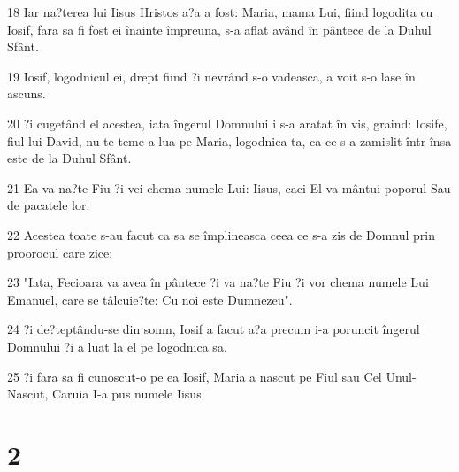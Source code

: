 \par 18 Iar na?terea lui Iisus Hristos a?a a fost: Maria, mama Lui, fiind logodita cu Iosif, fara sa fi fost ei înainte împreuna, s-a aflat având în pântece de la Duhul Sfânt.
\par 19 Iosif, logodnicul ei, drept fiind ?i nevrând s-o vadeasca, a voit s-o lase în ascuns.
\par 20 ?i cugetând el acestea, iata îngerul Domnului i s-a aratat în vis, graind: Iosife, fiul lui David, nu te teme a lua pe Maria, logodnica ta, ca ce s-a zamislit într-însa este de la Duhul Sfânt.
\par 21 Ea va na?te Fiu ?i vei chema numele Lui: Iisus, caci El va mântui poporul Sau de pacatele lor.
\par 22 Acestea toate s-au facut ca sa se împlineasca ceea ce s-a zis de Domnul prin proorocul care zice:
\par 23 "Iata, Fecioara va avea în pântece ?i va na?te Fiu ?i vor chema numele Lui Emanuel, care se tâlcuie?te: Cu noi este Dumnezeu".
\par 24 ?i de?teptându-se din somn, Iosif a facut a?a precum i-a poruncit îngerul Domnului ?i a luat la el pe logodnica sa.
\par 25 ?i fara sa fi cunoscut-o pe ea Iosif, Maria a nascut pe Fiul sau Cel Unul-Nascut, Caruia I-a pus numele Iisus.

\chapter{2}

